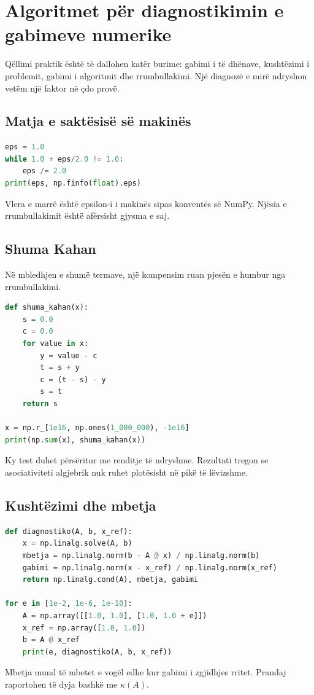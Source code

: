 \section{Algoritmet për diagnostikimin e gabimeve numerike}
Qëllimi praktik është të dallohen katër burime: gabimi i të dhënave, kushtëzimi i problemit, gabimi i algoritmit dhe rrumbullakimi. Një diagnozë e mirë ndryshon vetëm një faktor në çdo provë.

\subsection{Matja e saktësisë së makinës}
\begin{lstlisting}[language=Python,caption={Vlerësimi empirik i distancës pranë njësisë.}]
eps = 1.0
while 1.0 + eps/2.0 != 1.0:
    eps /= 2.0
print(eps, np.finfo(float).eps)
\end{lstlisting}
Vlera e marrë është epsilon-i i makinës sipas konventës së NumPy. Njësia e rrumbullakimit është afërsisht gjysma e saj.

\subsection{Shuma Kahan}
Në mbledhjen e shumë termave, një kompensim ruan pjesën e humbur nga rrumbullakimi.
\begin{lstlisting}[language=Python,caption={Mbledhja e kompensuar Kahan.}]
def shuma_kahan(x):
    s = 0.0
    c = 0.0
    for value in x:
        y = value - c
        t = s + y
        c = (t - s) - y
        s = t
    return s

x = np.r_[1e16, np.ones(1_000_000), -1e16]
print(np.sum(x), shuma_kahan(x))
\end{lstlisting}
Ky test duhet përsëritur me renditje të ndryshme. Rezultati tregon se asociativiteti algjebrik nuk ruhet plotësisht në pikë të lëvizshme.

\subsection{Kushtëzimi dhe mbetja}
\begin{lstlisting}[language=Python,caption={Krahasimi i gabimit me mbetjen.}]
def diagnostiko(A, b, x_ref):
    x = np.linalg.solve(A, b)
    mbetja = np.linalg.norm(b - A @ x) / np.linalg.norm(b)
    gabimi = np.linalg.norm(x - x_ref) / np.linalg.norm(x_ref)
    return np.linalg.cond(A), mbetja, gabimi

for e in [1e-2, 1e-6, 1e-10]:
    A = np.array([[1.0, 1.0], [1.0, 1.0 + e]])
    x_ref = np.array([1.0, 1.0])
    b = A @ x_ref
    print(e, diagnostiko(A, b, x_ref))
\end{lstlisting}
Mbetja mund të mbetet e vogël edhe kur gabimi i zgjidhjes rritet. Prandaj raportohen të dyja bashkë me $\kappa(A)$.

